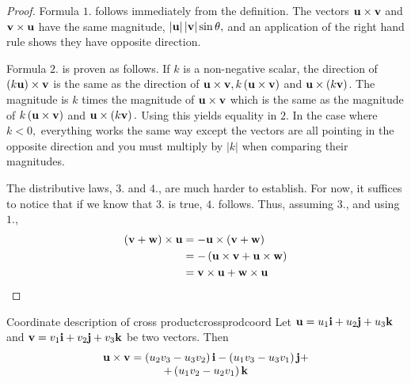 \begin{proof}
Formula $1.$ follows immediately from the definition. The vectors 
${\bf u}\times {\bf v}$ and ${\bf v}\times {\bf u}$ have the same magnitude, 
$\left\vert {\bf u}\right\vert \left\vert {\bf v}\right\vert \sin
\theta ,$ and an application of the right hand rule shows they have opposite
direction. 

Formula $2.$ is proven as follows. If $k $ is a
non-negative scalar, the direction of $\left( k {\bf u}\right)
\times {\bf v}$ is the same as the direction of ${\bf u}\times {\bf v},
k \left( {\bf u}\times {\bf v}\right) $ and ${\bf u}\times \left(
k {\bf v}\right) $. The magnitude is  $k$ times the
magnitude of ${\bf u}\times {\bf v}$ which is the same as the magnitude of 
$k \left( {\bf u}\times {\bf v}\right) $ and ${\bf u}\times \left(
k {\bf v}\right) .$ Using this yields equality in $2$. In
the case where $k <0,$ everything works the same way except the vectors
are all pointing in the opposite direction and you must multiply by 
$\left\vert k \right\vert $ when comparing their magnitudes. 

The distributive laws, $3.$ and $4.$, are much harder to establish. For now, it suffices to
 notice that if we know that $3.$ is true, $4.$ follows. Thus, assuming $3.$, and using $1.$,
\begin{align*}
\left( {\bf v}+{\bf w}\right) \times {\bf u}& =-{\bf u}\times \left(
{\bf v}+{\bf w}\right) \\
& =-\left( {\bf u}\times {\bf v}+{\bf u}\times {\bf w}\right) \\
& ={\bf v}\times {\bf u}+{\bf w}\times {\bf u}
\end{align*}
\end{proof}

\begin{proposition}{Coordinate description of cross product}{crossprodcoord}
 Let ${\bf u}=u_{1}{\bf i}+u_{2}{\bf j}+u_{3}{\bf k}$
 and ${\bf v}=v_{1}{\bf i}+v_{2}{\bf j}+v_{3}{\bf k}$ be two
vectors. Then
\begin{equation}
\begin{array}{c}
{\bf u}\times {\bf v} 
 =\left( u_{2}v_{3}-u_{3}v_{2}\right) {\bf i}-\left(
u_{1}v_{3} - u_{3}v_{1}\right) {\bf j}+  \\
 +\left( u_{1}v_{2}-u_{2}v_{1}\right) {\bf k}  \label{crossprod1}
\end{array}
\end{equation}
\end{proposition}

